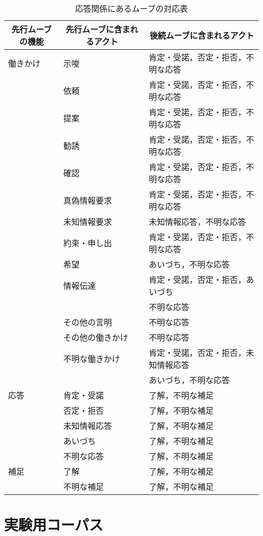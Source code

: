 \begin{table}[tbt]
  \begin{center}
    \caption{応答関係にあるムーブの対応表}
    \label{tbl:crp}
    \begin{tabular}{|l|l|l|}
      \hline
      \multicolumn{1}{|c|}{先行ムーブの機能} & \multicolumn{1}{|c|}{先行ムーブに含まれるアクト} & \multicolumn{1}{|c|}{後続ムーブに含まれるアクト} \\
      \hline
      \hline
      働きかけ&示唆&肯定・受諾，否定・拒否，不明な応答\\
      &依頼&肯定・受諾，否定・拒否，不明な応答\\
      &提案&肯定・受諾，否定・拒否，不明な応答\\
      &勧誘&肯定・受諾，否定・拒否，不明な応答\\
      &確認&肯定・受諾，否定・拒否，不明な応答\\
      &真偽情報要求&肯定・受諾，否定・拒否，不明な応答\\
      &未知情報要求&未知情報応答，不明な応答\\
      &約束・申し出&肯定・受諾，否定・拒否，不明な応答\\
      &希望&あいづち，不明な応答\\
      &情報伝達&肯定・受諾，否定・拒否，あいづち\\
      &&不明な応答\\
      &その他の言明&不明な応答\\
      &その他の働きかけ&不明な応答\\
      &不明な働きかけ&肯定・受諾，否定・拒否，未知情報応答\\
      &&あいづち，不明な応答\\
      \hline
      応答&肯定・受諾&了解，不明な補足\\
      &否定・拒否&了解，不明な補足\\
      &未知情報応答&了解，不明な補足\\
      &あいづち&了解，不明な補足\\
      &不明な応答&了解，不明な補足\\
      \hline
      補足&了解&了解，不明な補足\\
      &不明な補足&了解，不明な補足\\
      \hline
    \end{tabular}
  \end{center}
\end{table}
\section{実験用コーパス}

